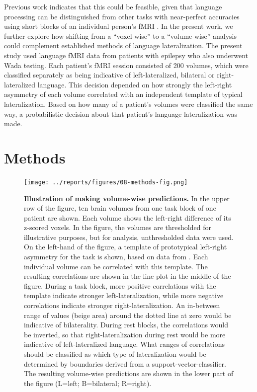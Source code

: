 \documentclass[fleqn,10pt]{SelfArx} %
\begin{document}
Previous work indicates that this could be feasible, given that language processing can be distinguished from other tasks with near-perfect accuracies using short blocks of an individual person’s fMRI \citep{Wegrzyn_2018}. In the present work, we further explore how shifting from a “voxel-wise” to a “volume-wise” analysis could complement established methods of language lateralization. The present study used language fMRI data from patients with epilepsy who also underwent Wada testing. Each patient’s fMRI session consisted of 200 volumes, which were classified separately as being indicative of left-lateralized, bilateral or right-lateralized language. This decision depended on how strongly the left-right asymmetry of each volume correlated with an independent template of typical lateralization. Based on how many of a patient’s volumes were classified the same way, a probabilistic decision about that patient’s language lateralization was made.

\section{Methods}


\begin{figure}[htb]
	\begin{minipage}{\textwidth}
		\renewcommand{\familydefault}{\sfdefault}\normalfont
		\centering
		\texttt{[image: ../reports/figures/08-methods-fig.png]}
		\caption{\textbf{Illustration of making volume-wise predictions.} In the upper row of the figure, ten brain volumes from one task block of one patient are shown. Each volume shows the left-right difference of its z-scored voxels. In the figure, the volumes are thresholded for illustrative purposes, but for analysis, unthresholded data were used. On the left-hand of the figure, a template of prototypical left-right asymmetry for the task is shown, based on data from \citet{Wegrzyn_2019}. Each individual volume can be correlated with this template. The resulting correlations are shown in the line plot in the middle of the figure. During a task block, more positive correlations with the template indicate stronger left-lateralization, while more negative correlations indicate stronger right-lateralization. An in-between range of values (beige area) around the dotted line at zero would be indicative of bilaterality. During rest blocks, the correlations would be inverted, so that right-lateralization during rest would be more indicative of left-lateralized language. What ranges of correlations should be classified as which type of lateralization would be determined by boundaries derived from a support-vector-classifier. The resulting volume-wise predictions are shown in the lower part of the figure (L=left; B=bilateral; R=right).}%
		\label{fig:method}
	\end{minipage}
\end{figure}
\end{document}
